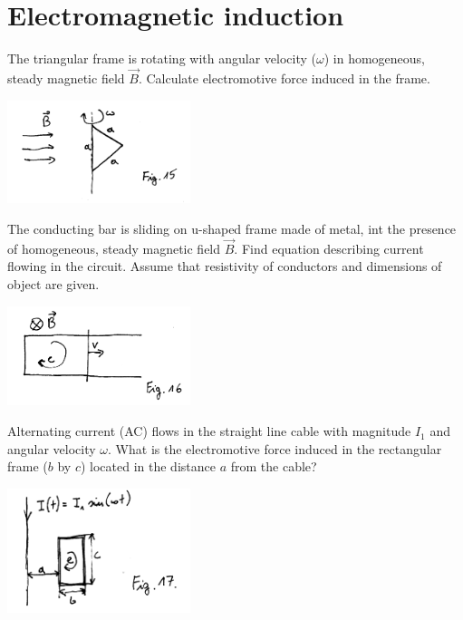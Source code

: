 \section{Electromagnetic induction}

\begin{Exercise}[difficulty=2]
The triangular frame is rotating with angular velocity ($\omega$) in homogeneous, steady magnetic field $\vec B$. Calculate electromotive force induced in the frame.
\begin{center}
\includegraphics[width=0.4\textwidth]{img/fig_ind1.png} 
\end{center}
\end{Exercise}

\begin{Exercise}[difficulty=2]
The conducting bar is sliding on u-shaped frame made of metal, int the presence of homogeneous, steady magnetic field $\vec B$. Find equation describing current flowing in the circuit. Assume that resistivity of conductors and dimensions of object are given.
\begin{center}
\includegraphics[width=0.4\textwidth]{img/fig_ind2.png} 
\end{center}
\end{Exercise}

\begin{Exercise}[difficulty=3]
Alternating current (AC) flows in the straight line cable with magnitude $I_1$ and angular velocity $\omega$. What is the electromotive force induced in the rectangular frame ($b$ by $c$) located in the distance $a$ from the cable?
\begin{center}
\includegraphics[width=0.4\textwidth]{img/fig_ind3.png} 
\end{center}
\end{Exercise}

